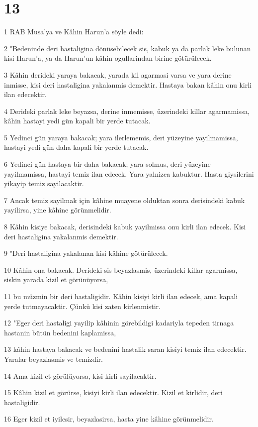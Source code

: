 \chapter{13}

\par 1 RAB Musa'ya ve Kâhin Harun'a söyle dedi:
\par 2 "Bedeninde deri hastaligina dönüsebilecek sis, kabuk ya da parlak leke bulunan kisi Harun'a, ya da Harun'un kâhin ogullarindan birine götürülecek.
\par 3 Kâhin derideki yaraya bakacak, yarada kil agarmasi varsa ve yara derine inmisse, kisi deri hastaligina yakalanmis demektir. Hastaya bakan kâhin onu kirli ilan edecektir.
\par 4 Derideki parlak leke beyazsa, derine inmemisse, üzerindeki killar agarmamissa, kâhin hastayi yedi gün kapali bir yerde tutacak.
\par 5 Yedinci gün yaraya bakacak; yara ilerlememis, deri yüzeyine yayilmamissa, hastayi yedi gün daha kapali bir yerde tutacak.
\par 6 Yedinci gün hastaya bir daha bakacak; yara solmus, deri yüzeyine yayilmamissa, hastayi temiz ilan edecek. Yara yalnizca kabuktur. Hasta giysilerini yikayip temiz sayilacaktir.
\par 7 Ancak temiz sayilmak için kâhine muayene olduktan sonra derisindeki kabuk yayilirsa, yine kâhine görünmelidir.
\par 8 Kâhin kisiye bakacak, derisindeki kabuk yayilmissa onu kirli ilan edecek. Kisi deri hastaligina yakalanmis demektir.
\par 9 "Deri hastaligina yakalanan kisi kâhine götürülecek.
\par 10 Kâhin ona bakacak. Derideki sis beyazlasmis, üzerindeki killar agarmissa, siskin yarada kizil et görünüyorsa,
\par 11 bu müzmin bir deri hastaligidir. Kâhin kisiyi kirli ilan edecek, ama kapali yerde tutmayacaktir. Çünkü kisi zaten kirlenmistir.
\par 12 "Eger deri hastaligi yayilip kâhinin görebildigi kadariyla tepeden tirnaga hastanin bütün bedenini kaplamissa,
\par 13 kâhin hastaya bakacak ve bedenini hastalik saran kisiyi temiz ilan edecektir. Yaralar beyazlasmis ve temizdir.
\par 14 Ama kizil et görülüyorsa, kisi kirli sayilacaktir.
\par 15 Kâhin kizil et görürse, kisiyi kirli ilan edecektir. Kizil et kirlidir, deri hastaligidir.
\par 16 Eger kizil et iyilesir, beyazlasirsa, hasta yine kâhine görünmelidir.
